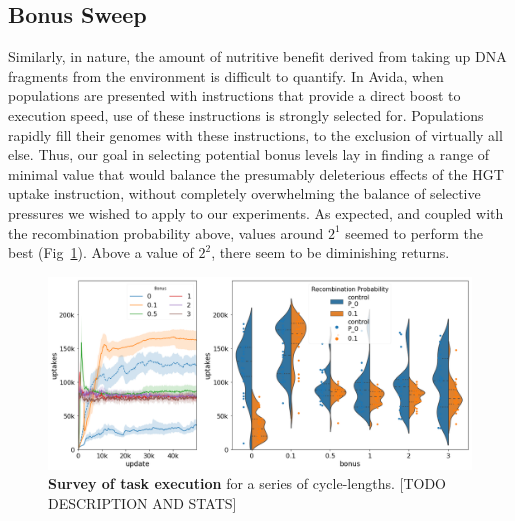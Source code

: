 \documentclass[PhD]{msu-thesis}
\begin{document}
\begin{appendices}
\section{Bonus Sweep}
Similarly, in nature, the amount of nutritive benefit derived from taking up DNA fragments from the environment is difficult to quantify. In Avida, when populations are presented with instructions that provide a direct boost to execution speed, use of these instructions is strongly selected for. Populations rapidly fill their genomes with these instructions, to the exclusion of virtually all else. Thus, our goal in selecting potential bonus levels lay in finding a range of minimal value that would balance the presumably deleterious effects of the HGT uptake instruction, without completely overwhelming the balance of selective pressures we wished to apply to our experiments. As expected, and coupled with the recombination probability above, values around $2^1$ seemed to perform the best (Fig~\ref{fig:a2-hgt-bonussweep-hgtuse}). Above a value of $2^2$, there seem to be diminishing returns.
	\begin{figure}[!h]
	\includegraphics[trim={0 0 0 0}, clip, width=0.85\columnwidth]{figures/A2/a2-hgt-bonussweep-hgtuse.png}
	\caption{\textbf{Survey of task execution} for a series of cycle-lengths. [TODO DESCRIPTION AND STATS]%
	}
	\label{fig:a2-hgt-bonussweep-hgtuse}
	\end{figure}




\end{appendices}
\end{document}
